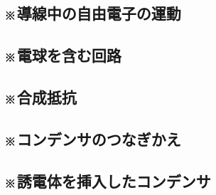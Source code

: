 \documentclass[../../../all/physics-standard_questions_all.tex]{subfiles}
\begin{document}
    \vspace{2cm}
    \vfill

\subsection{※導線中の自由電子の運動}
    

    \vspace{2cm}
    \vfill

\subsection{※電球を含む回路}
    

    \vspace{2cm}
    \vfill

\subsection{※合成抵抗}
    

    \vspace{2cm}
    \vfill

\subsection{※コンデンサのつなぎかえ}
    

    \vspace{2cm}
    \vfill

\subsection{※誘電体を挿入したコンデンサ}
    

    \vspace{2cm}
    \vfill
\end{document}
